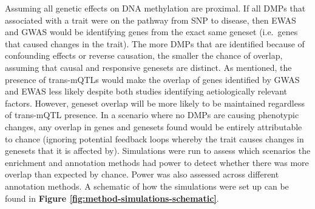 \documentclass[11pt,twoside]{bristolthesis}
\begin{document}
Assuming all genetic effects on DNA methylation are proximal. If all DMPs that associated with a trait were on the pathway from SNP to disease, then EWAS and GWAS would be identifying genes from the exact same geneset (i.e.~genes that caused changes in the trait). The more DMPs that are identified because of confounding effects or reverse causation, the smaller the chance of overlap, assuming that causal and responsive genesets are distinct. As mentioned, the presence of trans-mQTLs would make the overlap of genes identified by GWAS and EWAS less likely despite both studies identifying aetiologically relevant factors. However, geneset overlap will be more likely to be maintained regardless of trans-mQTL presence. In a scenario where no DMPs are causing phenotypic changes, any overlap in genes and genesets found would be entirely attributable to chance (ignoring potential feedback loops whereby the trait causes changes in genesets that it is affected by). Simulations were run to assess which scenarios the enrichment and annotation methods had power to detect whether there was more overlap than expected by chance. Power was also assessed across different annotation methods. A schematic of how the simulations were set up can be found in \textbf{Figure \ref{fig:method-simulations-schematic}}.
\end{document}
